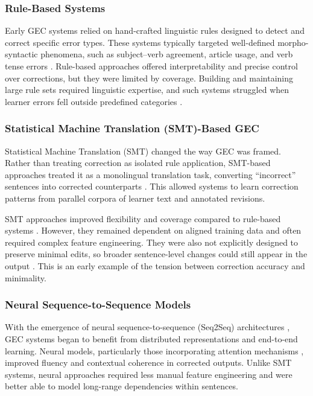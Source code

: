 \subsubsection{Rule-Based Systems}

Early GEC systems relied on hand-crafted linguistic rules designed to detect and correct specific error types. These systems typically targeted well-defined morpho-syntactic phenomena, such as subject--verb agreement, article usage, and verb tense errors \cite{ng-etal-2014-conll}. Rule-based approaches offered interpretability and precise control over corrections, but they were limited by coverage. Building and maintaining large rule sets required linguistic expertise, and such systems struggled when learner errors fell outside predefined categories \cite{10.1162/coli_a_00478}.

\subsubsection{Statistical Machine Translation (SMT)-Based GEC}

Statistical Machine Translation (SMT) changed the way GEC was framed. Rather than treating correction as isolated rule application, SMT-based approaches treated it as a monolingual translation task, converting ``incorrect'' sentences into corrected counterparts \cite{brockett2006correcting}. This allowed systems to learn correction patterns from parallel corpora of learner text and annotated revisions.

SMT approaches improved flexibility and coverage compared to rule-based systems \cite{ng-etal-2014-conll}. However, they remained dependent on aligned training data and often required complex feature engineering. They were also not explicitly designed to preserve minimal edits, so broader sentence-level changes could still appear in the output \cite{10.1162/coli_a_00478}. This is an early example of the tension between correction accuracy and minimality.

\subsubsection{Neural Sequence-to-Sequence Models}

With the emergence of neural sequence-to-sequence (Seq2Seq) architectures \cite{NIPS2014_5a18e133}, GEC systems began to benefit from distributed representations and end-to-end learning. Neural models, particularly those incorporating attention mechanisms \cite{bahdanau2016neuralmachinetranslationjointly}, improved fluency and contextual coherence in corrected outputs. Unlike SMT systems, neural approaches required less manual feature engineering and were better able to model long-range dependencies within sentences.

